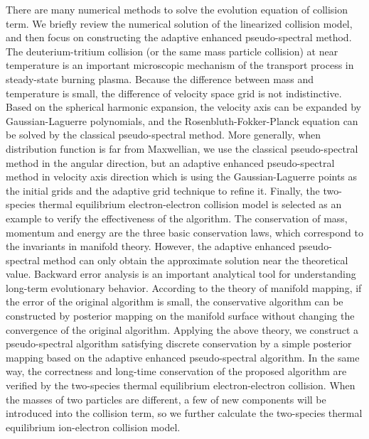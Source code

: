 \begin{abstract*}
There are many numerical methods to solve the evolution equation of collision term. We briefly review the numerical solution of the linearized collision model, and then focus on constructing the adaptive enhanced pseudo-spectral method. The deuterium-tritium collision (or the same mass particle collision) at near temperature is an important microscopic mechanism of the transport process in steady-state burning plasma. Because the difference between mass and temperature is small, the difference of velocity space grid is not indistinctive. Based on the spherical harmonic expansion, the velocity axis can be expanded by Gaussian-Laguerre polynomials, and the Rosenbluth-Fokker-Planck equation can be solved by the classical pseudo-spectral method. More generally, when distribution function is far from Maxwellian, we use the classical pseudo-spectral method in the angular direction, but an adaptive enhanced pseudo-spectral method in velocity axis direction which is using the Gaussian-Laguerre points as the initial grids and the adaptive grid technique to refine it. Finally, the two-species thermal equilibrium electron-electron collision model is selected as an example to verify the effectiveness of the algorithm.
The conservation of mass, momentum and energy are the three basic conservation laws, which correspond to the invariants in manifold theory. However, the adaptive enhanced pseudo-spectral method can only obtain the approximate solution near the theoretical value. Backward error analysis is an important analytical tool for understanding long-term evolutionary behavior. According to the theory of manifold mapping, if the error of the original algorithm is small, the conservative algorithm can be constructed by posterior mapping on the manifold surface without changing the convergence of the original algorithm. Applying the above theory, we construct a pseudo-spectral algorithm satisfying discrete conservation by a simple posterior mapping based on the adaptive enhanced pseudo-spectral algorithm. In the same way, the correctness and long-time conservation of the proposed algorithm are verified by the two-species thermal equilibrium electron-electron collision. When the masses of two particles are different, a few of new components will be introduced into the collision term, so we further calculate the two-species thermal equilibrium ion-electron collision model.


\end{abstract*}
